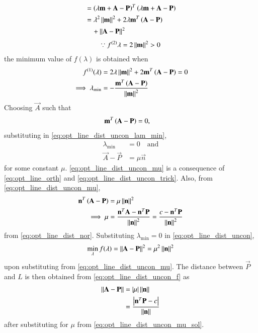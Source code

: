 \begin{enumerate}[label=\arabic*.,ref=\thesubsection.\theenumi]
\begin{align}
& = \left( \lambda \mathbf{m}+\mathbf{A} -\mathbf{P}\right)^T \left( \lambda \mathbf{m}+\mathbf{A} -\mathbf{P}\right)
\\
&= \lambda^2 \left\lVert\mathbf{m}\right\rVert^2 +2\lambda \mathbf{m}^T\left(\mathbf{A} -\mathbf{P}\right) 
\nonumber \\
&\quad + \left\lVert\mathbf{A} -\mathbf{P}\right\rVert^2
\label{eq:opt_line_dist_uncon_dist}
\end{align}
\begin{align}
\because f^{(2)}\lambda = 2\left\lVert\mathbf{m}\right\rVert^2 > 0
\end{align}
%
the minimum value of $f(\lambda)$ is obtained when 
%
\begin{align}
 f^{(1)}(\lambda) &= 2\lambda\left\lVert\mathbf{m}\right\rVert^2 + 2 \mathbf{m}^T\left(\mathbf{A} -\mathbf{P}\right) =0
\\
\implies \lambda_{\min} &= -\frac{\mathbf{m}^T\left(\mathbf{A} -\mathbf{P}\right)}{\left\lVert\mathbf{m}\right\rVert^2}
\label{eq:opt_line_dist_uncon_lam_min}
\end{align}
%
Choosing $\vec{A}$ such that 
%
\begin{align}
\mathbf{m}^T\left(\mathbf{A} -\mathbf{P}\right) &= 0,
\label{eq:opt_line_dist_uncon_trick}
\end{align}
%
substituting in \eqref{eq:opt_line_dist_uncon_lam_min},
%
\begin{align}
\label{eq:opt_line_dist_uncon_lam0}
\lambda_{\min} &= 0 \quad \text{and}
\\
\vec{A} -\vec{P} &= \mu \vec{n}
\label{eq:opt_line_dist_uncon_mu}
\end{align}
for some constant $\mu$. \eqref{eq:opt_line_dist_uncon_mu}
 is a consequence of \eqref{eq:opt_line_orth} and \eqref{eq:opt_line_dist_uncon_trick}. Also, from 
\eqref{eq:opt_line_dist_uncon_mu},
%
\begin{align}
\mathbf{n}^T\left(\mathbf{A} -\mathbf{P} \right) &= \mu \left\lVert\mathbf{n}\right\rVert^2
\\
\implies \mu & = \frac{\mathbf{n}^T\mathbf{A} -\mathbf{n}^T\mathbf{P} }{\left\lVert\mathbf{n}\right\rVert^2} = \frac{c -\mathbf{n}^T\mathbf{P} }{\left\lVert\mathbf{n}\right\rVert^2}
\label{eq:opt_line_dist_uncon_mu_sol}
\end{align}
%
from \eqref{eq:opt_line_dist_nor}.
Substituting $\lambda_{\min} = 0$ in \eqref{eq:opt_line_dist_uncon},
%
\begin{align}
\min_{\lambda}f(\lambda) =  \left\lVert\mathbf{A} -\mathbf{P}\right\rVert^2 = \mu^2\left\lVert\mathbf{n}\right\rVert^2
\label{eq:opt_line_dist_uncon_f}
\end{align}
upon substituting from \eqref{eq:opt_line_dist_uncon_mu}. The distance between $\vec{P}$ and ${L}$ is then obtained from \eqref{eq:opt_line_dist_uncon_f} as
\begin{align}
\left\lVert\mathbf{A} -\mathbf{P}\right\rVert &= \left\vert\mu\right\vert\left\lVert\mathbf{n}\right\rVert
\\
&= \frac{\left\vert\mathbf{n}^T\mathbf{P} -c \right\vert}{\left\lVert\mathbf{n}\right\rVert}
\end{align}
after substituting for $\mu$ from  \eqref{eq:opt_line_dist_uncon_mu_sol}.


\end{enumerate}
